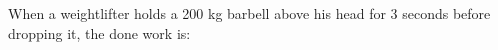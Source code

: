When a weightlifter holds a 200 kg barbell above his head 
for 3 seconds before dropping it, the done work is: